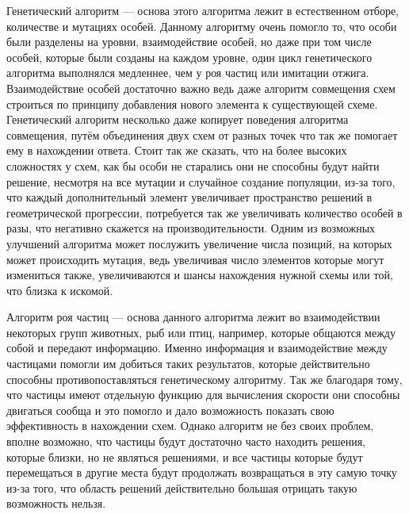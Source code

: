 \documentclass[14pt]{extarticle} %
\begin{document}
Генетический алгоритм --- основа этого алгоритма лежит в естественном отборе, количестве и мутациях особей. Данному алгоритму очень помогло то, что особи были разделены на уровни, взаимодействие особей, но даже при том числе особей, которые были созданы на каждом уровне, один цикл генетического алгоритма выполнялся медленнее, чем у роя частиц или имитации отжига. Взаимодействие особей достаточно важно ведь даже алгоритм совмещения схем строиться по принципу добавления нового элемента к существующей схеме. Генетический алгоритм несколько даже копирует поведения алгоритма совмещения, путём объединения двух схем от разных точек что так же помогает ему в нахождении ответа.  Стоит так же сказать, что на более высоких сложностях у схем, как бы особи не старались они не способны будут найти решение, несмотря на все мутации и случайное создание популяции, из-за того, что каждый дополнительный элемент увеличивает пространство решений в геометрической прогрессии, потребуется так же увеличивать количество особей в разы, что негативно скажется на производительности. Одним из возможных улучшений алгоритма может послужить увеличение числа позиций, на которых может происходить мутация, ведь увеличивая число элементов которые могут измениться также, увеличиваются и шансы нахождения нужной схемы или той, что близка к искомой.

Алгоритм роя частиц --- основа данного алгоритма лежит во взаимодействии некоторых групп животных, рыб или птиц, например, которые общаются между собой и передают информацию. Именно информация и взаимодействие между частицами помогли им добиться таких результатов, которые действительно способны противопоставляться генетическому алгоритму. Так же благодаря тому, что частицы имеют отдельную функцию для вычисления скорости они способны двигаться сообща и это помогло и дало возможность показать свою эффективность в нахождении схем. Однако алгоритм не без своих проблем, вполне возможно, что частицы будут достаточно часто находить решения, которые близки, но не являться решениями, и все частицы которые будут перемещаться в другие места будут продолжать возвращаться в эту самую точку из-за того, что область решений действительно большая отрицать такую возможность нельзя. 
\end{document}
